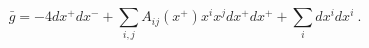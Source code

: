 \begin{equation}
 \bar g = -4 d x^+ d x^- + \sum_{i,j} A_{ij} (x^+) x^i x^j dx^+ dx^+ 
  + \sum_i d x^i dx^i ~.
\end{equation}

